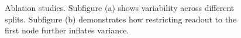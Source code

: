 \documentclass{article}
\begin{document}
\begin{figure}[ht]
\centering
{}
\hfill
{}
\caption{Ablation studies. Subfigure (a) shows variability across different splits. Subfigure (b) demonstrates how restricting readout to the first node further inflates variance.}
\label{fig:ablation}
\end{figure}
\end{document}
